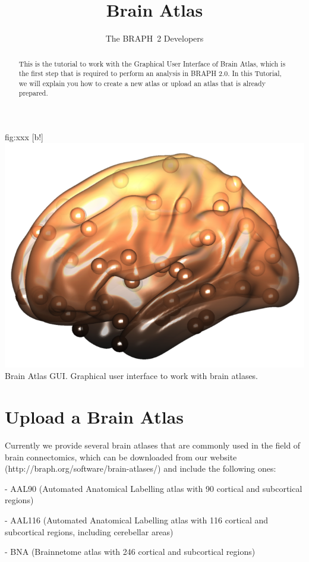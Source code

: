 \documentclass{tufte-handout}
\title{Brain Atlas}
\author[The BRAPH~2 Developers]{The BRAPH~2 Developers}
\begin{document}
\maketitle

	{fig:xxx}
	{
	[b!]
	\includegraphics{tut_ba/fig1.png}
	}
	{Brain Atlas GUI.}
	{
	Graphical user interface to work with brain atlases. 
	}
	
\begin{abstract}
\noindent
This is the tutorial to work with the Graphical User Interface of Brain Atlas, which is the first step that is required to perform an analysis in BRAPH 2.0. 
In this Tutorial, we will explain you how to create a new atlas or upload an atlas that is already prepared.
\end{abstract}


\clearpage
\section{Upload a Brain Atlas}

Currently we provide several brain atlases that are commonly used in the field of brain connectomics, which can be downloaded from our website (http://braph.org/software/brain-atlases/) and include the following ones:


- AAL90 (Automated Anatomical Labelling atlas with 90 cortical and subcortical regions)


- AAL116 (Automated Anatomical Labelling atlas with 116 cortical and subcortical regions, including cerebellar areas)


- BNA (Brainnetome atlas with 246 cortical and subcortical regions)
\end{document}
